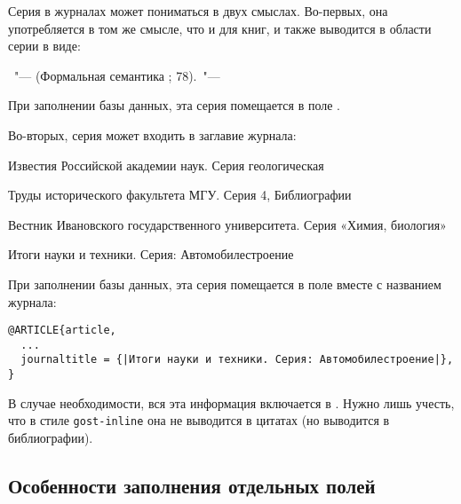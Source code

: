 \documentclass[10pt,a4paper,headings=small,numbers=enddot,english,russian]{ltxdockit}[2011/03/25]
\newcommand*{\bibsty}{\texttt}
\newenvironment{bibexample}{\begin{list}{}{}}{\end{list}}
\begin{document}
\begin{description}
Серия в журналах может пониматься в двух смыслах. Во-первых, она употребляется в
том же смысле, что и для книг, и также выводится в области серии в виде:

\begin{bibexample}
\item \textellipsis~"--- (Формальная семантика ; 78).~"--- \textellipsis
\end{bibexample}

При заполнении базы данных, эта серия помещается в поле .

Во-вторых, серия может входить в заглавие журнала: 

\begin{bibexample}
\item Известия Российской академии наук. Серия геологическая
\item Труды исторического факультета МГУ. Серия 4, Библиографии
\item Вестник Ивановского государственного университета. Серия «Химия, биология»
\item Итоги науки и техники. Серия: Автомобилестроение
\end{bibexample}

При заполнении базы данных, эта серия помещается в поле 
вместе с названием журнала:

\begin{lstlisting}[style=bibtex,escapechar=|]
@ARTICLE{article,
  ...
  journaltitle = {|Итоги науки и техники. Серия: Автомобилестроение|},
}
\end{lstlisting}

\item[Области примечания, стандартного номера и условий доступности.] В случае 
необходимости, вся эта информация включается в . Нужно лишь учесть, что
в стиле \bibsty{gost-inline} она не выводится в цитатах (но выводится в библиографии).

\end{description}

\subsection{Особенности заполнения отдельных полей}
\label{sec:filling}
\end{document}
